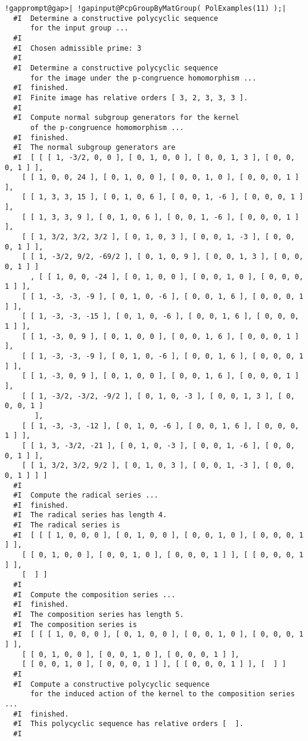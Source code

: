 \documentclass[a4paper,11pt]{report}
\begin{document}
{{\begin{Verbatim}[commandchars=!@|,fontsize=\small,frame=single,label=Example]
  !gapprompt@gap>| !gapinput@PcpGroupByMatGroup( PolExamples(11) );|
  #I  Determine a constructive polycyclic sequence
      for the input group ...
  #I
  #I  Chosen admissible prime: 3
  #I
  #I  Determine a constructive polycyclic sequence
      for the image under the p-congruence homomorphism ...
  #I  finished.
  #I  Finite image has relative orders [ 3, 2, 3, 3, 3 ].
  #I
  #I  Compute normal subgroup generators for the kernel
      of the p-congruence homomorphism ...
  #I  finished.
  #I  The normal subgroup generators are
  #I  [ [ [ 1, -3/2, 0, 0 ], [ 0, 1, 0, 0 ], [ 0, 0, 1, 3 ], [ 0, 0, 0, 1 ] ],
    [ [ 1, 0, 0, 24 ], [ 0, 1, 0, 0 ], [ 0, 0, 1, 0 ], [ 0, 0, 0, 1 ] ],
    [ [ 1, 3, 3, 15 ], [ 0, 1, 0, 6 ], [ 0, 0, 1, -6 ], [ 0, 0, 0, 1 ] ],
    [ [ 1, 3, 3, 9 ], [ 0, 1, 0, 6 ], [ 0, 0, 1, -6 ], [ 0, 0, 0, 1 ] ],
    [ [ 1, 3/2, 3/2, 3/2 ], [ 0, 1, 0, 3 ], [ 0, 0, 1, -3 ], [ 0, 0, 0, 1 ] ],
    [ [ 1, -3/2, 9/2, -69/2 ], [ 0, 1, 0, 9 ], [ 0, 0, 1, 3 ], [ 0, 0, 0, 1 ] ]
      , [ [ 1, 0, 0, -24 ], [ 0, 1, 0, 0 ], [ 0, 0, 1, 0 ], [ 0, 0, 0, 1 ] ],
    [ [ 1, -3, -3, -9 ], [ 0, 1, 0, -6 ], [ 0, 0, 1, 6 ], [ 0, 0, 0, 1 ] ],
    [ [ 1, -3, -3, -15 ], [ 0, 1, 0, -6 ], [ 0, 0, 1, 6 ], [ 0, 0, 0, 1 ] ],
    [ [ 1, -3, 0, 9 ], [ 0, 1, 0, 0 ], [ 0, 0, 1, 6 ], [ 0, 0, 0, 1 ] ],
    [ [ 1, -3, -3, -9 ], [ 0, 1, 0, -6 ], [ 0, 0, 1, 6 ], [ 0, 0, 0, 1 ] ],
    [ [ 1, -3, 0, 9 ], [ 0, 1, 0, 0 ], [ 0, 0, 1, 6 ], [ 0, 0, 0, 1 ] ],
    [ [ 1, -3/2, -3/2, -9/2 ], [ 0, 1, 0, -3 ], [ 0, 0, 1, 3 ], [ 0, 0, 0, 1 ]
       ],
    [ [ 1, -3, -3, -12 ], [ 0, 1, 0, -6 ], [ 0, 0, 1, 6 ], [ 0, 0, 0, 1 ] ],
    [ [ 1, 3, -3/2, -21 ], [ 0, 1, 0, -3 ], [ 0, 0, 1, -6 ], [ 0, 0, 0, 1 ] ],
    [ [ 1, 3/2, 3/2, 9/2 ], [ 0, 1, 0, 3 ], [ 0, 0, 1, -3 ], [ 0, 0, 0, 1 ] ] ]
  #I
  #I  Compute the radical series ...
  #I  finished.
  #I  The radical series has length 4.
  #I  The radical series is
  #I  [ [ [ 1, 0, 0, 0 ], [ 0, 1, 0, 0 ], [ 0, 0, 1, 0 ], [ 0, 0, 0, 1 ] ],
    [ [ 0, 1, 0, 0 ], [ 0, 0, 1, 0 ], [ 0, 0, 0, 1 ] ], [ [ 0, 0, 0, 1 ] ],
    [  ] ]
  #I
  #I  Compute the composition series ...
  #I  finished.
  #I  The composition series has length 5.
  #I  The composition series is
  #I  [ [ [ 1, 0, 0, 0 ], [ 0, 1, 0, 0 ], [ 0, 0, 1, 0 ], [ 0, 0, 0, 1 ] ],
    [ [ 0, 1, 0, 0 ], [ 0, 0, 1, 0 ], [ 0, 0, 0, 1 ] ],
    [ [ 0, 0, 1, 0 ], [ 0, 0, 0, 1 ] ], [ [ 0, 0, 0, 1 ] ], [  ] ]
  #I
  #I  Compute a constructive polycyclic sequence
      for the induced action of the kernel to the composition series ...
  #I  finished.
  #I  This polycyclic sequence has relative orders [  ].
  #I

\end{Verbatim}}}
\end{document}
